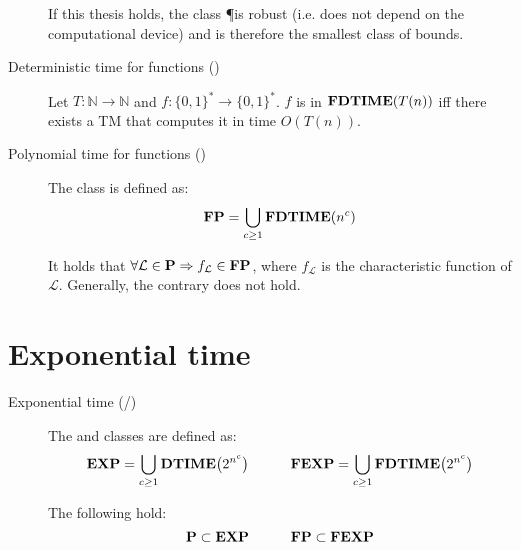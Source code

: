\begin{description}
        \begin{remark}
            If this thesis holds, the class \P is robust 
            (i.e. does not depend on the computational device)
            and is therefore the smallest class of bounds.
        \end{remark}

    \item[Deterministic time for functions (\FDTIME)] 
        Let $T: \mathbb{N} \rightarrow \mathbb{N}$ and 
        $f: \{0, 1\}^* \rightarrow \{0, 1\}^*$.
        $f$ is in $\textbf{FDTIME}(T(n))$ iff
        there exists a TM that computes it in time $O(T(n))$.

    \item[Polynomial time for functions (\FP)] 
        The class \FP is defined as:
        \[ \textbf{FP} = \bigcup_{c \geq 1} \textbf{FDTIME}(n^c) \]
        
        \begin{remark}
            It holds that $\forall \mathcal{L} \in \textbf{P} \Rightarrow f_\mathcal{L} \in \textbf{FP}$,
            where $f_\mathcal{L}$ is the characteristic function of $\mathcal{L}$.
            Generally, the contrary does not hold.
        \end{remark}
\end{description}



\section{Exponential time}

\begin{description}
    \item[Exponential time (\EXP/\FEXP)] 
        The \EXP and \FEXP classes are defined as:
        \[
            \textbf{EXP} = \bigcup_{c \geq 1} \textbf{DTIME}\big( 2^{n^c} \big) \hspace{3em} 
            \textbf{FEXP} = \bigcup_{c \geq 1} \textbf{FDTIME}\big( 2^{n^c} \big)
        \]

        \begin{theorem}
            The following hold:
            \[ \textbf{P} \subset \textbf{EXP} \hspace{3em} \textbf{FP} \subset \textbf{FEXP} \]
        \end{theorem}
\end{description}